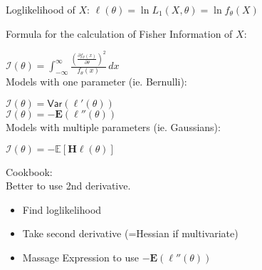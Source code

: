 Loglikelihood of $X$:
$\ell (\theta ) = \ln L_1(X, \theta ) = \ln f_\theta (X)$

Formula for the calculation of Fisher Information of $X$:

$\displaystyle  \mathcal{I}(\theta )= \int _{-\infty }^\infty \frac{\left(\frac{\partial f_\theta (x)}{\partial \theta }\right)^2}{f_\theta (x)} \,  dx$ \\

Models with one parameter (ie. Bernulli):

$\mathcal{I}(\theta ) = \textsf{Var}(\ell '(\theta ))$\\

$\mathcal{I}(\theta ) = - \mathbf{E}(\ell ''(\theta ))$\\

Models with multiple parameters (ie. Gaussians):

$\mathcal{I}(\theta ) = -\mathbb E\left[\mathbf{H}\ell (\theta )\right]$

Cookbook:\\

Better to use 2nd derivative.\\

\begin{itemize}
  \item Find loglikelihood
  \item Take second derivative (=Hessian if multivariate)
  \item Massage Expression to use $- \mathbf{E}(\ell ''(\theta ))$
\end{itemize}